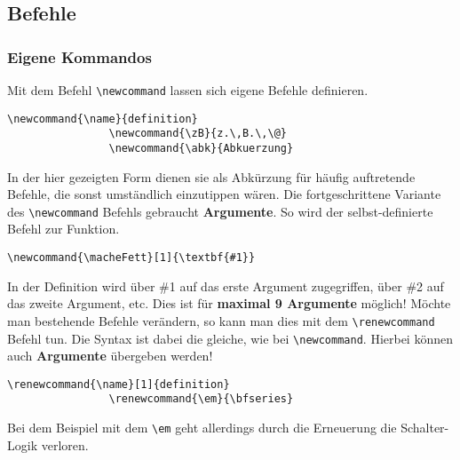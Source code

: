 \documentclass[10pt]{scrartcl}  %
\begin{document}
    \subsection{Befehle}
        \subsubsection{Eigene Kommandos}
            Mit dem Befehl \verb!\newcommand! lassen sich eigene Befehle definieren.
            \lstset{language=TeX}
            \begin{lstlisting}[frame=single]
                \newcommand{\name}{definition}
                \newcommand{\zB}{z.\,B.\,\@}
                \newcommand{\abk}{Abkuerzung}
            \end{lstlisting}
            In der hier gezeigten Form dienen sie als Abkürzung für häufig auftretende Befehle, die sonst umständlich einzutippen wären.
            Die fortgeschrittene Variante des \verb!\newcommand! Befehls gebraucht \textbf{Argumente}. So wird der selbst-definierte Befehl zur Funktion.
            \lstset{language=TeX}
            \begin{lstlisting}[frame=single]
                \newcommand{\macheFett}[1]{\textbf{#1}}
            \end{lstlisting}
            In der Definition wird über \#1 auf das erste Argument zugegriffen, über \#2 auf das zweite Argument, etc. Dies ist für \textbf{maximal 9 Argumente} möglich!
            Möchte man bestehende Befehle verändern, so kann man dies mit dem \verb!\renewcommand! Befehl tun. Die Syntax ist dabei die gleiche, wie bei \verb!\newcommand!. Hierbei können auch \textbf{Argumente} übergeben werden!
            \lstset{language=TeX}
            \begin{lstlisting}[frame=single]
                \renewcommand{\name}[1]{definition}
                \renewcommand{\em}{\bfseries}
            \end{lstlisting}
            Bei dem Beispiel mit dem \verb!\em! geht allerdings durch die Erneuerung die Schalter-Logik verloren.
\end{document}
